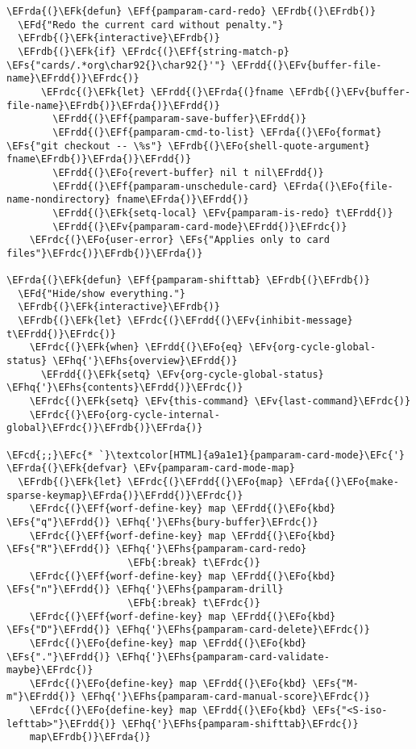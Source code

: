 \documentclass[a4wide,10pt]{article}
\newcommand{\EFc}[1]{\textcolor{EFc}{#1}} %
\newcommand{\EFcd}[1]{\textcolor{EFcd}{#1}} %
\newcommand{\EFs}[1]{\textcolor{EFs}{#1}} %
\newcommand{\EFd}[1]{\textcolor{EFd}{#1}} %
\newcommand{\EFk}[1]{\textcolor{EFk}{#1}} %
\newcommand{\EFb}[1]{\textcolor{EFb}{#1}} %
\newcommand{\EFf}[1]{\textcolor{EFf}{#1}} %
\newcommand{\EFv}[1]{\textcolor{EFv}{#1}} %
\newcommand{\EFo}[1]{\textcolor{EFo}{#1}} %
\newcommand{\EFhq}[1]{\textcolor{EFhq}{#1}} %
\newcommand{\EFhs}[1]{\textcolor{EFhs}{#1}} %
\newcommand{\EFrda}[1]{\textcolor{EFrda}{#1}} %
\newcommand{\EFrdb}[1]{\textcolor{EFrdb}{#1}} %
\newcommand{\EFrdc}[1]{\textcolor{EFrdc}{#1}} %
\newcommand{\EFrdd}[1]{\textcolor{EFrdd}{#1}} %
\begin{document}
\begin{Code}
\begin{Verbatim}
\EFrda{(}\EFk{defun} \EFf{pamparam-card-redo} \EFrdb{(}\EFrdb{)}
  \EFd{"Redo the current card without penalty."}
  \EFrdb{(}\EFk{interactive}\EFrdb{)}
  \EFrdb{(}\EFk{if} \EFrdc{(}\EFf{string-match-p} \EFs{"cards/.*org\char92{}\char92{}'"} \EFrdd{(}\EFv{buffer-file-name}\EFrdd{)}\EFrdc{)}
      \EFrdc{(}\EFk{let} \EFrdd{(}\EFrda{(}fname \EFrdb{(}\EFv{buffer-file-name}\EFrdb{)}\EFrda{)}\EFrdd{)}
        \EFrdd{(}\EFf{pamparam-save-buffer}\EFrdd{)}
        \EFrdd{(}\EFf{pamparam-cmd-to-list} \EFrda{(}\EFo{format} \EFs{"git checkout -- \%s"} \EFrdb{(}\EFo{shell-quote-argument} fname\EFrdb{)}\EFrda{)}\EFrdd{)}
        \EFrdd{(}\EFo{revert-buffer} nil t nil\EFrdd{)}
        \EFrdd{(}\EFf{pamparam-unschedule-card} \EFrda{(}\EFo{file-name-nondirectory} fname\EFrda{)}\EFrdd{)}
        \EFrdd{(}\EFk{setq-local} \EFv{pamparam-is-redo} t\EFrdd{)}
        \EFrdd{(}\EFv{pamparam-card-mode}\EFrdd{)}\EFrdc{)}
    \EFrdc{(}\EFo{user-error} \EFs{"Applies only to card files"}\EFrdc{)}\EFrdb{)}\EFrda{)}

\EFrda{(}\EFk{defun} \EFf{pamparam-shifttab} \EFrdb{(}\EFrdb{)}
  \EFd{"Hide/show everything."}
  \EFrdb{(}\EFk{interactive}\EFrdb{)}
  \EFrdb{(}\EFk{let} \EFrdc{(}\EFrdd{(}\EFv{inhibit-message} t\EFrdd{)}\EFrdc{)}
    \EFrdc{(}\EFk{when} \EFrdd{(}\EFo{eq} \EFv{org-cycle-global-status} \EFhq{'}\EFhs{overview}\EFrdd{)}
      \EFrdd{(}\EFk{setq} \EFv{org-cycle-global-status} \EFhq{'}\EFhs{contents}\EFrdd{)}\EFrdc{)}
    \EFrdc{(}\EFk{setq} \EFv{this-command} \EFv{last-command}\EFrdc{)}
    \EFrdc{(}\EFo{org-cycle-internal-global}\EFrdc{)}\EFrdb{)}\EFrda{)}

\EFcd{;;}\EFc{* `}\textcolor[HTML]{a9a1e1}{pamparam-card-mode}\EFc{'}
\EFrda{(}\EFk{defvar} \EFv{pamparam-card-mode-map}
  \EFrdb{(}\EFk{let} \EFrdc{(}\EFrdd{(}\EFo{map} \EFrda{(}\EFo{make-sparse-keymap}\EFrda{)}\EFrdd{)}\EFrdc{)}
    \EFrdc{(}\EFf{worf-define-key} map \EFrdd{(}\EFo{kbd} \EFs{"q"}\EFrdd{)} \EFhq{'}\EFhs{bury-buffer}\EFrdc{)}
    \EFrdc{(}\EFf{worf-define-key} map \EFrdd{(}\EFo{kbd} \EFs{"R"}\EFrdd{)} \EFhq{'}\EFhs{pamparam-card-redo}
                     \EFb{:break} t\EFrdc{)}
    \EFrdc{(}\EFf{worf-define-key} map \EFrdd{(}\EFo{kbd} \EFs{"n"}\EFrdd{)} \EFhq{'}\EFhs{pamparam-drill}
                     \EFb{:break} t\EFrdc{)}
    \EFrdc{(}\EFf{worf-define-key} map \EFrdd{(}\EFo{kbd} \EFs{"D"}\EFrdd{)} \EFhq{'}\EFhs{pamparam-card-delete}\EFrdc{)}
    \EFrdc{(}\EFo{define-key} map \EFrdd{(}\EFo{kbd} \EFs{"."}\EFrdd{)} \EFhq{'}\EFhs{pamparam-card-validate-maybe}\EFrdc{)}
    \EFrdc{(}\EFo{define-key} map \EFrdd{(}\EFo{kbd} \EFs{"M-m"}\EFrdd{)} \EFhq{'}\EFhs{pamparam-card-manual-score}\EFrdc{)}
    \EFrdc{(}\EFo{define-key} map \EFrdd{(}\EFo{kbd} \EFs{"<S-iso-lefttab>"}\EFrdd{)} \EFhq{'}\EFhs{pamparam-shifttab}\EFrdc{)}
    map\EFrdb{)}\EFrda{)}


\end{Verbatim}
\end{Code}
\end{document}
